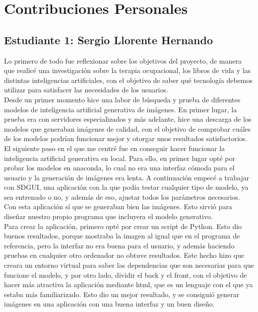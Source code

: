 \chapter*{Contribuciones Personales}
\label{cap:contribucionesPersonales}
\section*{Estudiante 1: Sergio Llorente Hernando}

Lo primero de todo fue reflexionar sobre los objetivos del proyecto, de manera que realicé una investigación sobre la terapia ocupacional, los libros de vida y las distintas inteligencias artificiales, con el objetivo de saber qué tecnología debemos utilizar para satisfacer las necesidades de los usuarios.\\

Desde un primer momento hice una labor de búsqueda y prueba de diferentes modelos de inteligencia artificial generativa de imágenes. En primer lugar, la prueba era con servidores especializados y más adelante, hice una descarga de los modelos que generaban imágenes de calidad, con el objetivo de comprobar cuáles de los modelos podrían funcionar mejor y otorgar unos resultados satisfactorios.\\

El siguiente paso en el que me centré fue en conseguir hacer funcionar la inteligencia artificial generativa en local. Para ello, en primer lugar opté por probar los modelos en anaconda, lo cual no era una interfaz cómoda para el usuario y la generación de imágenes era lenta. A continuación empecé a trabajar con SDGUI, una aplicación con la que podía testar cualquier tipo de modelo, ya sea entrenado o no, y además de eso, ajustar todos los parámetros necesarios. Con esta aplicación sí que se generaban bien las imágenes. Esto sirvió para diseñar nuestro propio programa que incluyera el modelo generativo. \\

Para crear la aplicación, primero opté por crear un script de Python. Esto dio buenos resultados, porque mostraba la imagen al igual que en el programa de referencia, pero la interfaz no era buena para el usuario, y además haciendo pruebas en cualquier otro ordenador no obtuve resultados. Este hecho hizo que creara un entorno virtual para saber las dependencias que son necesarias para que funcione el modelo, y por otro lado, dividir el back y el front, con el objetivo de hacer más atractiva la aplicación mediante html, que es un lenguaje con el que ya estaba más familiarizado. Esto dio un mejor resultado, y se consiguió generar imágenes en una aplicación con una buena interfaz y un buen diseño.\\


